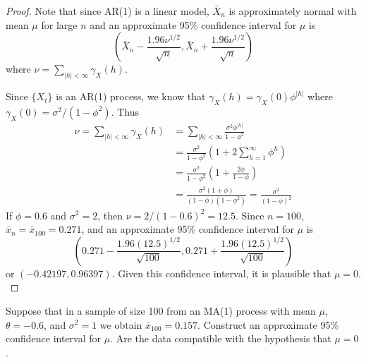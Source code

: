 \documentclass[12pt]{article}
\theoremstyle{definition}
\newenvironment{custompbm}[1]
  {\renewcommand\theproblem{#1}\problem}
  {\endproblem}
\begin{document}
\begin{proof}
  Note that since AR(1) is a linear model, $\bar{X}_n$ is approximately normal
  with mean $\mu$ for large $n$ and an approximate 95\% confidence interval for
  $\mu$ is
  \[
    \left(\bar{X}_{n} - \frac{1.96\nu^{1/2}}{\sqrt{n}}, \bar{X}_{n} + \frac{1.96\nu^{1/2}}{\sqrt{n}}\right)
  \]
  where $\nu = \sum_{|h|<\infty}\gamma_X(h)$.

  Since $\{X_t\}$ is an AR(1) process, we know that $\gamma_X(h) = \gamma_X(0)\phi^{|h|}$
  where $\gamma_X(0) = \sigma^2 / (1 - \phi^2)$. Thus
  \begin{align*}
    \nu = \sum_{|h| < \infty} \gamma_X(h)
    &= \sum_{|h| < \infty} \frac{\sigma^2 \phi^{|h|}}{1 - \phi^2} \\
    &= \frac{\sigma ^ 2}{1 - \phi^2} \left(1 + 2\sum_{h=1}^\infty\phi^h\right) \\
    &= \frac{\sigma ^ 2}{1 - \phi^2} \left(1 + \frac{2\phi}{1-\phi}\right) \\
    &= \frac{\sigma ^ 2(1+\phi)}{(1-\phi)(1 - \phi^2)} = \frac{\sigma ^ 2}{(1-\phi)^2}
  \end{align*}
  If $\phi = 0.6$ and $\sigma^2 = 2$, then $\nu = 2 / (1 - 0.6)^2 = 12.5$. Since $n=100$,
  $\bar{x}_{n} = \bar{x}_{100} = 0.271$, and an approximate 95\% confidence interval
  for $\mu$ is
  \[
    \left(0.271 - \frac{1.96(12.5)^{1/2}}{\sqrt{100}}, 0.271 + \frac{1.96(12.5)^{1/2}}{\sqrt{100}}\right)
  \]
  or $(-0.42197, 0.96397)$. Given this confidence interval, it is plausible that
  $\mu = 0.$
\end{proof}


\begin{custompbm}{2.12}
  Suppose that in a sample of size 100 from an MA(1) process with mean $\mu$,
  $\theta=-0.6$, and $\sigma^2 = 1$ we obtain $\bar{x}_{100} = 0.157$.
  Construct an approximate 95\% confidence interval for $\mu$. Are the data
  compatible with the hypothesis that $\mu = 0$.
\end{custompbm}
\end{document}
